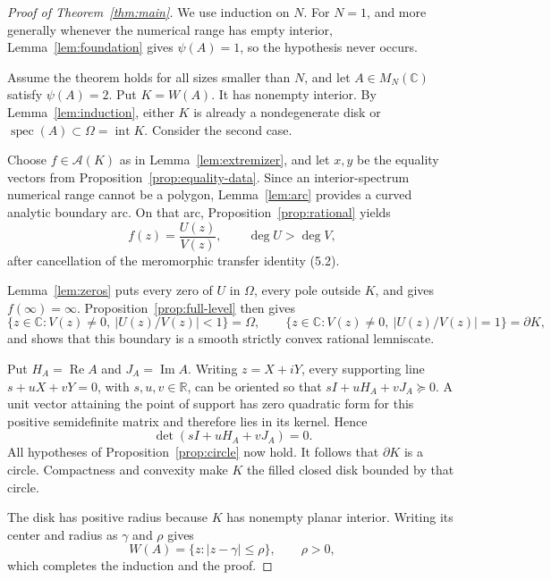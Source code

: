 \documentclass[preprints,article,submit,oneauthor]{Definitions/mdpi}
\numberwithin{equation}{section}
\newcommand{\C}{\mathbb C}
\newcommand{\R}{\mathbb R}
\newcommand{\spec}{\operatorname{spec}}
\newcommand{\Rea}{\operatorname{Re}}
\newcommand{\Ima}{\operatorname{Im}}
\newcommand{\Int}{\operatorname{int}}
\begin{document}
\begin{proof}[Proof of Theorem~\ref{thm:main}]
We use induction on \(N\).  For \(N=1\), and more generally whenever the
numerical range has empty interior,
Lemma~\ref{lem:foundation} gives \(\psi(A)=1\), so the hypothesis never occurs.

Assume the theorem holds for all sizes smaller than \(N\), and let
\(A\in M_N(\C)\) satisfy
\(\psi(A)=2\).  Put \(K=W(A)\).  It has nonempty interior.  By
Lemma~\ref{lem:induction}, either \(K\) is already a nondegenerate disk or
\(\spec(A)\subset\Omega=\Int K\).  Consider the second case.

Choose \(f\in\mathcal A(K)\) as in Lemma~\ref{lem:extremizer}, and let \(x,y\)
be the equality vectors from Proposition~\ref{prop:equality-data}.  Since an
interior-spectrum numerical range cannot be a polygon, Lemma~\ref{lem:arc}
provides a curved analytic boundary arc.  On that arc,
Proposition~\ref{prop:rational} yields
\[
 f(z)=\frac{U(z)}{V(z)},\qquad \deg U>\deg V,
\]
after cancellation of the meromorphic transfer identity (5.2).

Lemma~\ref{lem:zeros} puts every zero of \(U\) in \(\Omega\), every pole
outside \(K\), and gives \(f(\infty)=\infty\).
Proposition~\ref{prop:full-level} then gives
\[
 \{z\in\C:V(z)\neq0,\ |U(z)/V(z)|<1\}=\Omega,
 \qquad
 \{z\in\C:V(z)\neq0,\ |U(z)/V(z)|=1\}=\partial K,
\]
and shows that this boundary is a smooth strictly convex rational lemniscate.

Put \(H_A=\Rea A\) and \(J_A=\Ima A\).  Writing \(z=X+iY\), every supporting
line \(s+uX+vY=0\), with \(s,u,v\in\R\), can be oriented so that
\(sI+uH_A+vJ_A\succeq0\).  A unit vector attaining the point of support has
zero quadratic form for this positive semidefinite matrix and therefore lies
in its kernel.  Hence
\[
 \det(sI+uH_A+vJ_A)=0.
\]
All hypotheses of Proposition~\ref{prop:circle} now hold.  It follows that
\(\partial K\) is a circle.  Compactness and convexity make \(K\) the filled
closed disk bounded by that circle.

The disk has positive radius because \(K\) has nonempty planar interior.
Writing its center and radius as \(\gamma\) and \(\rho\) gives
\[
 W(A)=\{z:|z-\gamma|\leq\rho\},\qquad \rho>0,
\]
which completes the induction and the proof.
\end{proof}

\end{document}
